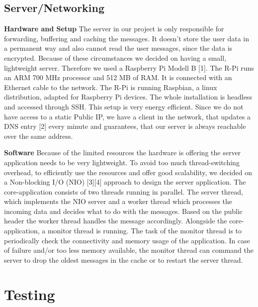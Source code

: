 \documentclass{report}
\begin{document}
\subsection{Server/Networking}
\textbf{Hardware and Setup}\newline
\indent The server in our project is only responsible for forwarding, buffering and caching the messages. It doesn't store the user data in a permanent way and also cannot read the user messages, since the data is encrypted. 
Because of these circumstances we decided on having a small, lightweight server. Therefore we used a Raspberry Pi Modell B [1]. The R-Pi runs an ARM 700 MHz processor and 512 MB of RAM. It is connected with an Ethernet cable to the network.
The R-Pi is running Raspbian, a linux distribution, adapted for Raspberry Pi devices. The whole installation is headless and accessed through SSH. This setup is very energy efficient. 
Since we do not have access to a static Public IP, we have a client in the network, that updates a DNS entry [2] every minute and guarantees, that our server is always reachable over the same address. 

\textbf{Software}\newline
\indent Because of the limited resources the hardware is offering the server application needs to be very lightweight. To avoid too much thread-switching overhead, to efficiently use the resources and offer good scalability, we decided on a Non-blocking I/O (NIO) [3][4] approach to design the server application. The core-application consists of two threads running in parallel. The server thread, which implements the NIO server and a worker thread which processes the incoming data and decides what to do with the messages. Based on the public header the worker thread handles the message accordingly.
Alongside the core-application, a monitor thread is running. The task of the monitor thread is to periodically check the connectivity and memory usage of the application. In case of failure and/or too less memory available, the monitor thread can command the server to drop the oldest messages in the cache or to restart the server thread. 

\section{Testing}
\end{document}
